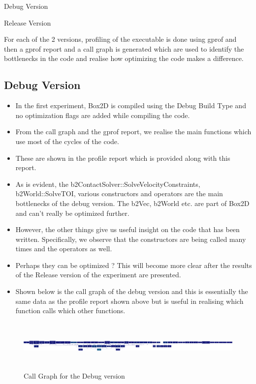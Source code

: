 \documentclass[11pt]{article}
\begin{document}
	
	
		 Debug Version
	
	
		 Release Version
	
	
	
	For each of the 2 versions, profiling of the executable is done using gprof and then a gprof report and a call graph is generated which are used to identify the bottlenecks in the code and realise how optimizing the code makes a difference.
	\subsection{Debug Version}
		\begin{itemize}
		\item In the first experiment, Box2D is compiled using the Debug Build Type and no optimization flags are added while compiling the code. 
		\item From the call graph and the gprof report, we realise the main functions which use most of the cycles of the code.
		\item These are shown in the profile report which is provided along with this report.
\item As is evident, the b2ContactSolver::SolveVelocityConstraints, b2World::SolveTOI, various constructors and operators are the main bottlenecks of the debug version. The b2Vec, b2World etc. are part of Box2D and can't really be optimized further. 
\item However, the other things give us useful insight on the code that has been written. Specifically, we observe that the constructors are being called many times and the operators as well.
\item  Perhaps they can be optimized ? This will become more clear after the results of the Release version of the experiment are presented.
\item Shown below is the call graph of the debug version and this is essentially the same data as the profile report shown above but is useful in realising which function calls which other functions.
\end{itemize}
\begin{figure}[h!]
\caption{Call Graph for the Debug version}
\centering
\includegraphics[width=\linewidth,height=2.5cm]{images/callgraphdebug}
\end{figure}
\end{document}
